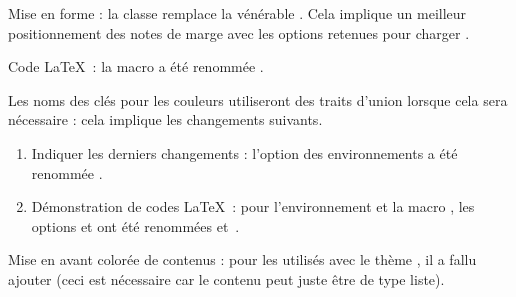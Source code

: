 \tdocsep




\begin{tdocbreak}[version = 1.7.0, date = 2024-12-04]
	\item Mise en forme : la classe  remplace la vénérable . Cela implique un meilleur positionnement des notes de marge avec les options retenues pour charger .

	\item Code \LaTeX\ : la macro  a été renommée .

	\item Les noms des clés pour les couleurs utiliseront des traits d'union lorsque cela sera nécessaire : cela implique les changements suivants.
	\begin{enumerate}
		\item Indiquer les derniers changements : l'option  des environnements a été renommée .

		\item Démonstration de codes \LaTeX\ : pour l'environnement  et la macro , les options  et  ont été renommées  et \,.
	\end{enumerate}
\end{tdocbreak}


\begin{tdocfix}
	\item Mise en avant colorée de contenus : pour les  utilisés avec le thème , il a fallu ajouter  (ceci est nécessaire car le contenu peut juste être de type liste).
\end{tdocfix}


